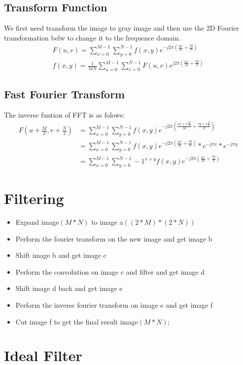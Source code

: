 \documentclass[11pt,oneside]{book}
\begin{document}
\subsection{Transform Function}
We ﬁrst need transform the image to gray image and then use the 2D Fourier transformation belw to change it to the frequence domain.
\begin{align}
F(u,v)=\sum_{x=0}^{M-1}\sum_{y=0}^{N-1}f(x,y)e^{-j2\pi(\frac{ux}{M}+\frac{vy}{N})}\\
f(x,y)=\frac{1}{MN}\sum_{u=0}^{M-1}\sum_{v=0}^{N-1}F(u,v)e^{j2\pi(\frac{ux}{M}+\frac{vy}{N})}
\end{align}
\subsection{Fast Fourier Transform}
The inverse funtion of FFT is as folows:
\begin{align}
F(u+\frac{M}{2},v+\frac{N}{2})&=\sum_{x=0}^{M-1}\sum_{y=0}^{N-1}f(x,y)e^{-j2\pi(\frac{ux+x\frac{M}{2}}{M}+\frac{vy+v\frac{N}{2}}{N})}\\
&=\sum_{x=0}^{M-1}\sum_{y=0}^{N-1}f(x,y)e^{-j2\pi(\frac{ux}{M}+\frac{vy}{N})}*e^{-j\pi x}*e^{-j\pi y}\\
&=\sum_{x=0}^{M-1}\sum_{y=0}^{N-1}-1^{x+y}f(x,y)e^{-j2\pi(\frac{ux}{M}+\frac{vy}{N})}
\end{align}
\section{Filtering}
\begin{itemize}
    \item Expand image$(M*N)$ to image a$((2*M)*(2*N))$
    \item Perform the fourier transform on the new image and get image b
    \item Shift image b and get image c
    \item Perform the convolution on image c and filter and get image d
    \item Shift image d back and get image e
    \item Perform the inverse fourier transform on image e and get image f
    \item Cut image f to get the final result image$(M*N)$;

\end{itemize}
\newpage
\section{Ideal Filter}
\end{document}
